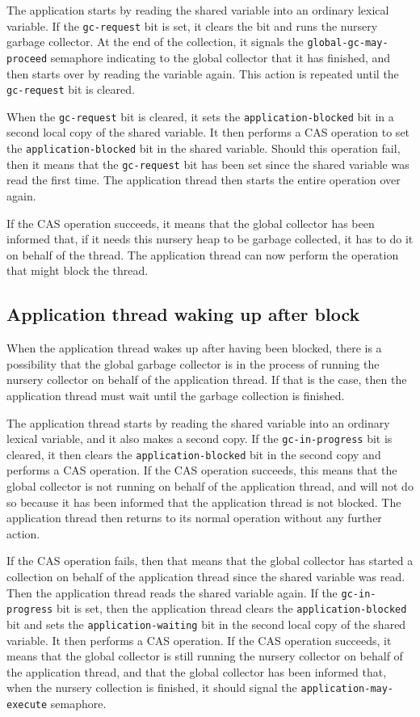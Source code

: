 The application starts by reading the shared variable into an ordinary
lexical variable.  If the \texttt{gc-request} bit is set, it clears
the bit and runs the nursery garbage collector.  At the end of the
collection, it signals the \texttt{global-gc-may-proceed} semaphore
indicating to the global collector that it has finished, and then
starts over by reading the variable again.  This action is repeated
until the \texttt{gc-request} bit is cleared.

When the \texttt{gc-request} bit is cleared, it sets the
\texttt{application-blocked} bit in a second local copy of the shared
variable.  It then performs a CAS operation to set the
\texttt{application-blocked} bit in the shared variable.  Should this
operation fail, then it means that the \texttt{gc-request} bit has
been set since the shared variable was read the first time.  The
application thread then starts the entire operation over again.

If the CAS operation succeeds, it means that the global collector has
been informed that, if it needs this nursery heap to be garbage
collected, it has to do it on behalf of the thread.  The application
thread can now perform the operation that might block the thread.

\subsection{Application thread waking up after block}

When the application thread wakes up after having been blocked, there
is a possibility that the global garbage collector is in the process
of running the nursery collector on behalf of the application thread.
If that is the case, then the application thread must wait until the
garbage collection is finished.

The application thread starts by reading the shared variable into an
ordinary lexical variable, and it also makes a second copy.  If the
\texttt{gc-in-progress} bit is cleared, it then clears the
\texttt{application-blocked} bit in the second copy and performs a CAS
operation.  If the CAS operation succeeds, this means that the global
collector is not running on behalf of the application thread, and will
not do so because it has been informed that the application thread is
not blocked.  The application thread then returns to its normal
operation without any further action.

If the CAS operation fails, then that means that the global collector
has started a collection on behalf of the application thread since the
shared variable was read.  Then the application thread
reads the shared variable again.  If the
\texttt{gc-in-progress} bit is set, then the application thread clears
the \texttt{application-blocked} bit and sets the
\texttt{application-waiting} bit in the second local copy of the
shared variable.  It then performs a CAS operation.  If the CAS
operation succeeds, it means that the global collector is still
running the nursery collector on behalf of the application thread, and
that the global collector has been informed that, when the nursery
collection is finished, it should signal the
\texttt{application-may-execute} semaphore.

